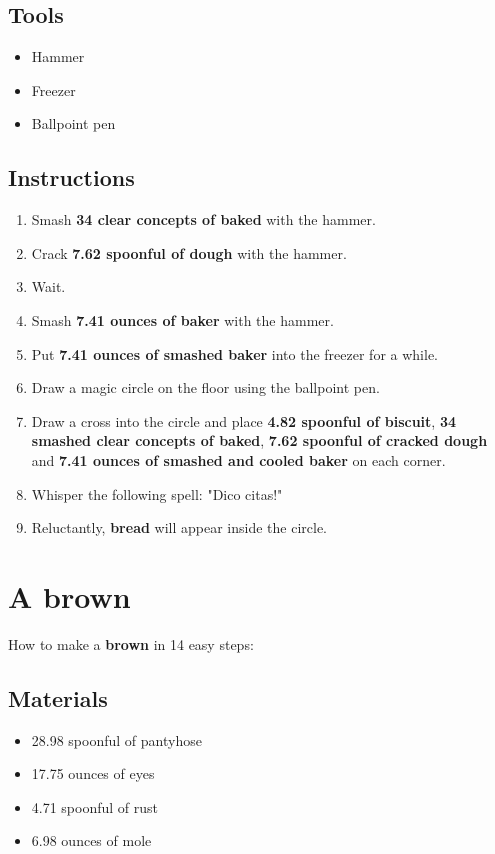 \documentclass{article}
\begin{document}
\subsection{Tools}\begin{itemize}
\item 
Hammer
\item 
Freezer
\item 
Ballpoint pen
\end{itemize}
\subsection{Instructions}\begin{enumerate}
\item 
Smash \textbf{34 clear concepts of baked} with the hammer.
\item 
Crack \textbf{7.62 spoonful of dough} with the hammer.
\item 
Wait.
\item 
Smash \textbf{7.41 ounces of baker} with the hammer.
\item 
Put \textbf{7.41 ounces of smashed baker} into the freezer for a while.
\item 
Draw a magic circle on the floor using the ballpoint pen.
\item 
Draw a cross into the circle and place \textbf{4.82 spoonful of biscuit}, \textbf{34 smashed clear concepts of baked}, \textbf{7.62 spoonful of cracked dough} and \textbf{7.41 ounces of smashed and cooled baker} on each corner.
\item 
Whisper the following spell: "Dico citas!"
\item 
Reluctantly, \textbf{bread} will appear inside the circle.
\end{enumerate}
\newpage
\section{A brown}How to make a \textbf{brown} in 14 easy steps:

\subsection{Materials}\begin{itemize}
\item 
28.98 spoonful of pantyhose
\item 
17.75 ounces of eyes
\item 
4.71 spoonful of rust
\item 
6.98 ounces of mole
\end{itemize}
\end{document}

